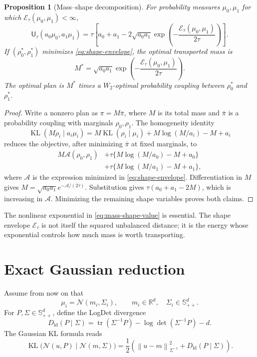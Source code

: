 \documentclass[11pt]{article}
\newtheorem{proposition}[theorem]{Proposition}
\theoremstyle{definition}
\theoremstyle{remark}
\newcommand{\R}{\mathbb R}
\newcommand{\Spp}{\mathbb S_{++}^d}
\newcommand{\tr}{\operatorname{tr}}
\newcommand{\KL}{\operatorname{KL}}
\newcommand{\UOT}{\mathsf U}
\newcommand{\cN}{\mathcal N}
\newcommand{\norm}[1]{\left\lVert #1\right\rVert}
\begin{document}
\begin{proposition}[Mass--shape decomposition]\label{prop:mass-shape}
For probability measures $\mu_0,\mu_1$ for which
$\mathcal E_\tau(\mu_0,\mu_1)<\infty$,
\begin{equation}\label{eq:mass-shape-value}
 \UOT_\tau(a_0\mu_0,a_1\mu_1)
 =\tau\left[
   a_0+a_1-2\sqrt{a_0a_1}
   \exp\!\left(-\frac{\mathcal E_\tau(\mu_0,\mu_1)}{2\tau}\right)
 \right].
\end{equation}
If $(\rho_0^*,\rho_1^*)$ minimizes \eqref{eq:shape-envelope}, the optimal
transported mass is
\begin{equation}\label{eq:optimal-mass}
 M^*=\sqrt{a_0a_1}
 \exp\!\left(-\frac{\mathcal E_\tau(\mu_0,\mu_1)}{2\tau}\right).
\end{equation}
The optimal plan is $M^*$ times a $W_2$-optimal probability coupling between
$\rho_0^*$ and $\rho_1^*$.
\end{proposition}

\begin{proof}
Write a nonzero plan as $\pi=M\bar\pi$, where $M$ is its total mass and
$\bar\pi$ is a probability coupling with marginals $\rho_0,\rho_1$. The
homogeneity identity
\[
 \KL(M\rho_i\mid a_i\mu_i)
 =M\KL(\rho_i\mid\mu_i)+M\log(M/a_i)-M+a_i
\]
reduces the objective, after minimizing $\bar\pi$ at fixed marginals, to
\begin{align*}
 M\mathcal A(\rho_0,\rho_1)
 &+\tau\{M\log(M/a_0)-M+a_0\}\\
 &+\tau\{M\log(M/a_1)-M+a_1\},
\end{align*}
where $\mathcal A$ is the expression minimized in
\eqref{eq:shape-envelope}. Differentiation in $M$ gives
$M=\sqrt{a_0a_1}e^{-\mathcal A/(2\tau)}$. Substitution gives
$\tau(a_0+a_1-2M)$, which is increasing in $\mathcal A$. Minimizing the
remaining shape variables proves both claims.
\end{proof}

The nonlinear exponential in \eqref{eq:mass-shape-value} is essential. The
shape envelope $\mathcal E_\tau$ is not itself the squared unbalanced
distance; it is the energy whose exponential controls how much mass is worth
transporting.

\section{Exact Gaussian reduction}

Assume from now on that
\begin{equation}\label{eq:gaussian-inputs}
 \mu_i=\cN(m_i,\Sigma_i),
 \qquad m_i\in\R^d,\quad \Sigma_i\in\Spp.
\end{equation}
For $P,\Sigma\in\Spp$, define the LogDet divergence
\begin{equation}\label{eq:logdet-divergence}
 D_{\mathrm{ld}}(P\mid\Sigma)
 =\tr(\Sigma^{-1}P)-\log\det(\Sigma^{-1}P)-d.
\end{equation}
The Gaussian KL formula reads
\begin{equation}\label{eq:gaussian-kl}
 \KL\bigl(\cN(u,P)\mid\cN(m,\Sigma)\bigr)
 =\frac12\left(
   \norm{u-m}_{\Sigma^{-1}}^2+D_{\mathrm{ld}}(P\mid\Sigma)
 \right).
\end{equation}
\end{document}

